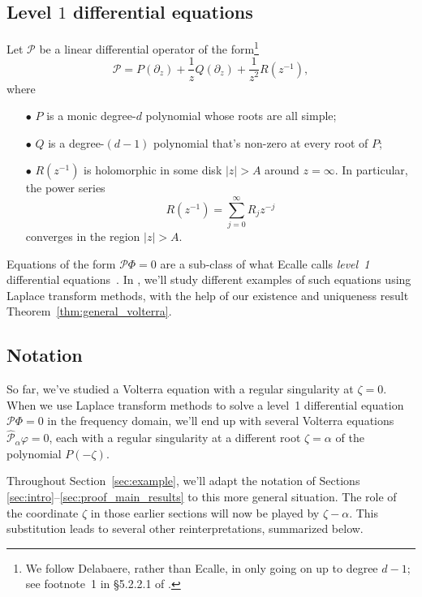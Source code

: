 \documentclass{article}
\theoremstyle{plain}
\begin{document}
\subsection{Level $1$ differential equations}\label{sec:level 1 ODE}
Let $\mathcal{P}$ be a linear differential operator of the form\footnote{ We follow Delabaere, rather than Ecalle, in only going on up to degree $d-1$; see footnote~1 in \S 5.2.2.1 of \cite{diverg-resurg-iii}.}
\[ \mathcal{P} = P(\partial_z) + \frac{1}{z} Q(\partial_z) + \frac{1}{z^2} R(z^{-1}), \]
where
\begin{enumerate}
\item[$\bullet$] $P$ is a monic degree-$d$ polynomial whose roots are all simple; 
\item[$\bullet$] $Q$ is a degree-$(d-1)$ polynomial that's non-zero at every root of $P$;
\item[$\bullet$] $R(z^{-1})$ is holomorphic in some disk $|z| > A$ around $z = \infty$. In particular, the power series
\[ R(z^{-1}) = \sum_{j=0}^\infty R_j z^{-j} \]
converges in the region $|z| > A$.
\end{enumerate}
Equations of the form $\mathcal{P}\Phi = 0$ are a sub-class of what Ecalle calls {\em level~1} differential equations~\cite[Section 2.1]{EcalleIII}. In \cite{borel_reg}, we'll study different examples of such equations using Laplace transform methods, with the help of our existence and uniqueness result Theorem~\ref{thm:general_volterra}. 
\subsection{Notation}\label{sec:notation_alpha}
So far, we've studied a Volterra equation with a regular singularity at $\zeta = 0$. When we use Laplace transform methods to solve a level~1 differential equation $\mathcal{P}\Phi = 0$ in the frequency domain, we'll end up with several Volterra equations $\hat{\mathcal{P}}_\alpha \varphi = 0$, each with a regular singularity at a different root $\zeta = \alpha$ of the polynomial $P(-\zeta)$.

Throughout Section~\ref{sec:example}, we'll adapt the notation of Sections \ref{sec:intro}--\ref{sec:proof_main_results} to this more general situation. The role of the coordinate $\zeta$ in those earlier sections will now be played by $\zeta-\alpha$. This substitution leads to several other reinterpretations, summarized below.
\end{document}
